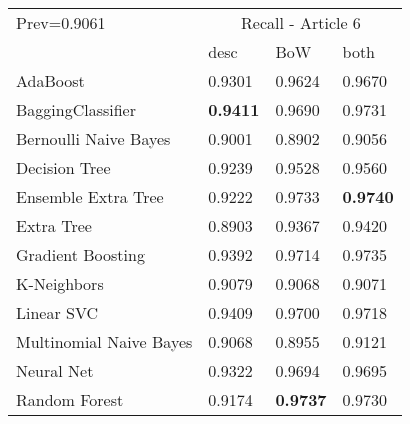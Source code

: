 \begin{tabular}{|l|l|l|l| }
\hline
Prev=0.9061 &  \multicolumn{3}{c|}{Recall - Article 6} \\
\cline{2-4} & desc & BoW & both \\ \hline
AdaBoost                & 0.9301 & 0.9624 & 0.9670\\
BaggingClassifier       & {\bf 0.9411} & 0.9690 & 0.9731\\
Bernoulli Naive Bayes   & 0.9001 & 0.8902 & 0.9056\\
Decision Tree           & 0.9239 & 0.9528 & 0.9560\\
Ensemble Extra Tree     & 0.9222 & 0.9733 & {\bf 0.9740}\\
Extra Tree              & 0.8903 & 0.9367 & 0.9420\\
Gradient Boosting       & 0.9392 & 0.9714 & 0.9735\\
K-Neighbors             & 0.9079 & 0.9068 & 0.9071\\
Linear SVC              & 0.9409 & 0.9700 & 0.9718\\
Multinomial Naive Bayes & 0.9068 & 0.8955 & 0.9121\\
Neural Net              & 0.9322 & 0.9694 & 0.9695\\
Random Forest           & 0.9174 & {\bf 0.9737} & 0.9730\\
\hline
\end{tabular}